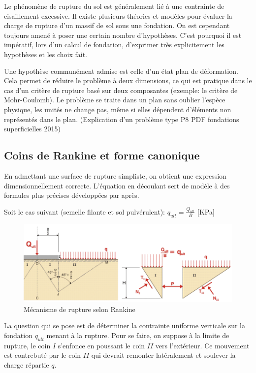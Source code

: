         Le phénomène de rupture du sol est généralement lié à une contrainte de cisaillement excessive. Il existe plusieurs théories et modèles pour évaluer la charge de rupture d'un massif de sol sous une fondation. On est cependant toujours amené à poser une certain nombre d'hypothèses. C'est pourquoi il est impératif, lors d'un calcul de fondation, d'exprimer très explicitement les hypothèses et les choix fait.
        
        Une hypothèse communément admise est celle d'un état plan de déformation. Cela permet de réduire le problème à deux dimensions, ce qui est pratique dans le cas d'un critère de rupture basé sur deux composantes (exemple: le critère de Mohr-Coulomb). Le problème se traite dans un plan sans oublier l'espèce physique, les unités ne change pas, même si elles dépendent d'éléments non représentés dans le plan. (Explication d'un problème type P8 PDF fondations superficielles 2015)
        
    \subsection{Coins de Rankine et forme canonique}
    
        En admettant une surface de rupture simpliste, on obtient une expression dimensionnellement correcte. L'équation en découlant sert de modèle à des formules plus précises développées par après.
        
        Soit le cas suivant (semelle filante et sol pulvérulent): $q_{ult} = \frac{Q_{ult}}{B}$ [KPa]
        
        \begin{figure}[h!]
            \center
            \includegraphics[scale=0.8]{Holeyman/images/H19.PNG}
            \caption{Mécanisme de rupture selon Rankine}
        \end{figure}
        
        La question qui se pose est de déterminer la contrainte uniforme verticale sur la fondation $q_{ult}$ menant à la rupture. Pour se faire, on suppose à la limite de rupture, le coin $I$ s'enfonce en poussant le coin $II$ vers l'extérieur. Ce mouvement est contrebuté par le coin $II$ qui devrait remonter latéralement et soulever la charge répartie $q$.
        
